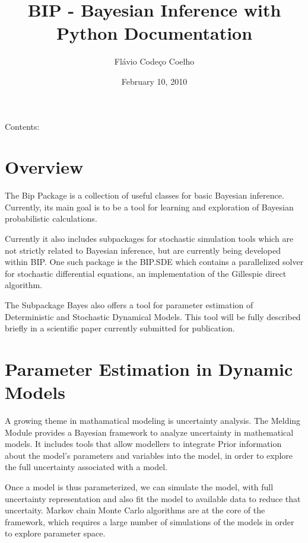 \documentclass[a4paper,10pt,english]{manual}
\title{BIP - Bayesian Inference with Python Documentation}
\date{February 10, 2010}
\author{Flávio Codeço Coelho}
\begin{document}
\maketitle
\tableofcontents
\hypertarget{--doc-index}{}


Contents:

\resetcurrentobjects
\hypertarget{--doc-overview}{}

\chapter{Overview}

The Bip Package is a collection of useful classes for basic Bayesian inference. Currently, its main goal is to be a tool for learning and exploration of Bayesian probabilistic calculations.

Currently it also includes subpackages for stochastic simulation tools which are not strictly related to Bayesian inference, but are currently being developed within BIP. One such package is the BIP.SDE which contains a parallelized solver for stochastic differential equations, an implementation of the Gillespie direct algorithm.

The Subpackage Bayes also offers a tool for parameter estimation of Deterministic and Stochastic Dynamical Models. This tool will be fully described briefly in a scientific paper currently submitted for publication.

\resetcurrentobjects
\hypertarget{--doc-paramest}{}

\chapter{Parameter Estimation in Dynamic Models}

A growing theme in mathamatical modeling is uncertainty analysis. The Melding Module provides a Bayesian framework to analyze uncertainty in mathematical models. It includes tools that allow modellers to integrate Prior information about the model's parameters and variables into the model, in order to explore the full uncertainty associated with a model.

Once a model is thus parameterized, we can simulate the model, with full uncertainty representation and also fit the model to available data to reduce that uncertaity. Markov chain Monte Carlo algorithms are at the core of the framework, which requires a large number of simulations of the models in order to explore parameter space.
\end{document}
